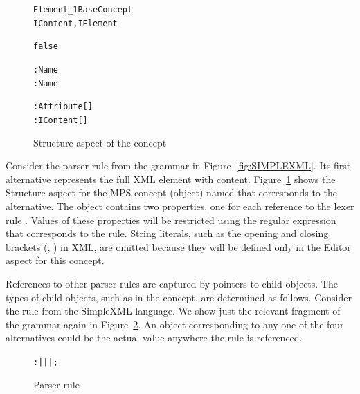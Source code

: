 \begin{figure}[ht]
\centering
\begin{alltt}
\small
{} Element\_1  BaseConcept
         IContent, IElement

   false
   \mpsstalias{< > </ >}
   

   : Name
   : Name
  
   : Attribute[]
     : IContent[]
\end{alltt}
\caption{Structure aspect of the  concept}
\label{fig:ELEMENTSTRUCT}
\end{figure}

Consider the parser rule  from the grammar in Figure~\ref{fig:SIMPLEXML}.
Its first alternative represents the full XML element with content.
Figure~\ref{fig:ELEMENTSTRUCT} shows the Structure aspect for the MPS concept (object) named  that corresponds to the alternative.
The object contains two properties, one for each reference to the lexer rule .
Values of these properties will be restricted using the regular expression that corresponds to the rule.
String literals, such as the opening and closing brackets (\antlrliteral{\textless}, \antlrliteral{/\textgreater}) in XML, are omitted because they will be defined only in the Editor aspect for this concept.

References to other parser rules are captured by pointers to child objects.
The types of child objects, such as  in the  concept, are determined as follows.
Consider the  rule from the SimpleXML language.
We show just the relevant fragment of the grammar again in Figure~\ref{fig:CONTENTRULE}.
An object corresponding to any one of the four alternatives could be the actual value anywhere the  rule is referenced.

\begin{figure}[ht]
\centering
\begin{alltt}
\small
{} :  |  |  |  ;
\end{alltt}
\caption{Parser rule }
\label{fig:CONTENTRULE}
\end{figure}


